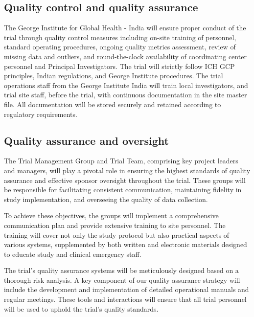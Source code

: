 \documentclass[
]{scrartcl}
\begin{document}
\subsection{Quality control and quality
assurance}\label{quality-control-and-quality-assurance}

The George Institute for Global Health - India will ensure proper
conduct of the trial through quality control measures including on-site
training of personnel, standard operating procedures, ongoing quality
metrics assessment, review of missing data and outliers, and
round-the-clock availability of coordinating center personnel and
Principal Investigators. The trial will strictly follow ICH GCP
principles, Indian regulations, and George Institute procedures. The
trial operations staff from the George Institute India will train local
investigators, and trial site staff, before the trial, with continuous
documentation in the site master file. All documentation will be stored
securely and retained according to regulatory requirements.

\subsection{Quality assurance and
oversight}\label{quality-assurance-and-oversight}

The Trial Management Group and Trial Team, comprising key project
leaders and managers, will play a pivotal role in ensuring the highest
standards of quality assurance and effective sponsor oversight
throughout the trial. These groups will be responsible for facilitating
consistent communication, maintaining fidelity in study implementation,
and overseeing the quality of data collection.

To achieve these objectives, the groups will implement a comprehensive
communication plan and provide extensive training to site personnel. The
training will cover not only the study protocol but also practical
aspects of various systems, supplemented by both written and electronic
materials designed to educate study and clinical emergency staff.

The trial's quality assurance systems will be meticulously designed
based on a thorough risk analysis. A key component of our quality
assurance strategy will include the development and implementation of
detailed operational manuals and regular meetings. These tools and
interactions will ensure that all trial personnel will be used to uphold
the trial's quality standards.
\end{document}
